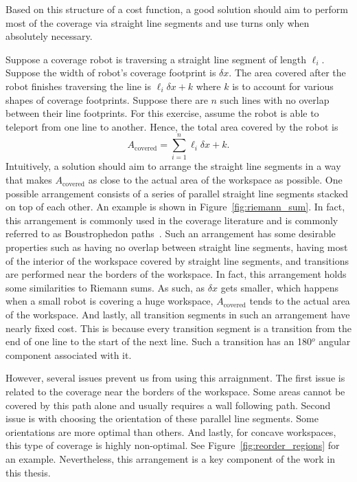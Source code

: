 \documentclass[../main.tex]{subfiles}
\begin{document}

Based on this structure of a cost function, a good solution should aim to perform most of the coverage via straight line segments and use turns only when absolutely necessary.

Suppose a coverage robot is traversing a straight line segment of length $\ell_i$. Suppose the width of robot's coverage footprint is $\delta x$. The area covered after the robot finishes traversing the line is $\ell_i\delta x+k$ where $k$ is to account for various shapes of coverage footprints. Suppose there are $n$ such lines with no overlap between their line footprints. For this exercise, assume the robot is able to teleport from one line to another. Hence, the total area covered by the robot is
\begin{equation}
	A_{\text{covered}}=\sum_{i=1}^n\ell_i\delta x + k.
\end{equation}
Intuitively, a solution should aim to arrange the straight line segments in a way that makes $A_{\text{covered}}$ as close to the actual area of the workspace as possible. One possible arrangement consists of a series of parallel straight line segments stacked on top of each other. An example is shown in Figure~\ref{fig:riemann_sum}. In fact, this arrangement is commonly used in the coverage literature and is commonly referred to as Boustrophedon paths~\cite{Choset1998coverage}. Such an arrangement has some desirable properties such as having no overlap between straight line segments, having most of the interior of the workspace covered by straight line segments, and transitions are performed near the borders of the workspace. In fact, this arrangement holds some similarities to Riemann sums. As such, as $\delta x$ gets smaller, which happens when a small robot is covering a huge workspace, $A_{\text{covered}}$ tends to the actual area of the workspace. And lastly, all transition segments in such an arrangement have nearly fixed cost. This is because every transition segment is a transition from the end of one line to the start of the next line. Such a transition has an 180$^o$ angular component associated with it.


However, several issues prevent us from using this arraignment. The first issue is related to the coverage near the borders of the workspace. Some areas cannot be covered by this path alone and usually requires a wall following path. Second issue is with choosing the orientation of these parallel line segments. Some orientations are more optimal than others. And lastly, for concave workspaces, this type of coverage is highly non-optimal. See Figure~\ref{fig:reorder_regions} for an example. Nevertheless, this arrangement is a key component of the work in this thesis.
\end{document}
